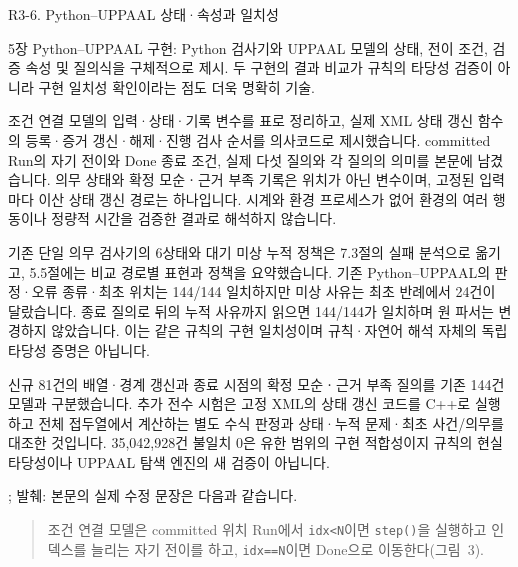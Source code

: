 \clearpage

\begin{reviewitem}{R3-6. Python–UPPAAL 상태·속성과 일치성}

\begin{reviewercomment}

5장 Python–UPPAAL 구현: Python 검사기와 UPPAAL 모델의 상태, 전이 조건, 검증 속성 및 질의식을 구체적으로 제시. 두 구현의 결과 비교가 규칙의 타당성 검증이 아니라 구현 일치성 확인이라는 점도 더욱 명확히 기술.

\end{reviewercomment}

\begin{authorresponse}

조건 연결 모델의 입력·상태·기록 변수를 표로 정리하고, 실제 XML 상태 갱신 함수의 등록·증거 갱신·해제·진행 검사 순서를 의사코드로 제시했습니다. committed Run의 자기 전이와 Done 종료 조건, 실제 다섯 질의와 각 질의의 의미를 본문에 남겼습니다. 의무 상태와 확정 모순ㆍ근거 부족 기록은 위치가 아닌 변수이며, 고정된 입력마다 이산 상태 갱신 경로는 하나입니다. 시계와 환경 프로세스가 없어 환경의 여러 행동이나 정량적 시간을 검증한 결과로 해석하지 않습니다.

기존 단일 의무 검사기의 6상태와 대기 미상 누적 정책은 7.3절의 실패 분석으로 옮기고, 5.5절에는 비교 경로별 표현과 정책을 요약했습니다. 기존 Python--UPPAAL의 판정·오류 종류·최초 위치는 144/144 일치하지만 미상 사유는 최초 반례에서 24건이 달랐습니다. 종료 질의로 뒤의 누적 사유까지 읽으면 144/144가 일치하며 원 파서는 변경하지 않았습니다. 이는 같은 규칙의 구현 일치성이며 규칙·자연어 해석 자체의 독립 타당성 증명은 아닙니다.

신규 81건의 배열·경계 갱신과 종료 시점의 확정 모순ㆍ근거 부족 질의를 기존 144건 모델과 구분했습니다. 추가 전수 시험은 고정 XML의 상태 갱신 코드를 C++로 실행하고 전체 접두열에서 계산하는 별도 수식 판정과 상태·누적 문제·최초 사건/의무를 대조한 것입니다. 35,042,928건 불일치 0은 유한 범위의 구현 적합성이지 규칙의 현실 타당성이나 UPPAAL 탐색 엔진의 새 검증이 아닙니다.

\end{authorresponse}

\begin{manuscriptrevision}{; 발췌: }
본문의 실제 수정 문장은 다음과 같습니다.

\begin{quote}
조건 연결 모델은 committed 위치 Run에서 \texttt{idx<N}이면 \texttt{step()}을 실행하고 인덱스를 늘리는 자기 전이를 하고, \texttt{idx==N}이면 Done으로 이동한다(그림~3).
\end{quote}
\end{manuscriptrevision}

\end{reviewitem}

